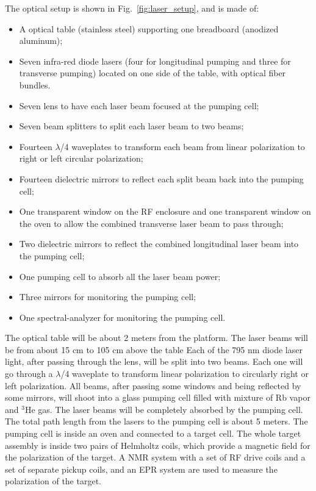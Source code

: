 {The optical setup is shown in Fig.~\ref{fig:laser_setup}, and is made of:
\begin {itemize}
\item A optical table (stainless steel) supporting one breadboard 
(anodized aluminum);
\item Seven infra-red diode lasers (four for longitudinal pumping and three 
for transverse pumping) located on one side of the table, with optical 
fiber bundles.
\item Seven lens to have each laser beam focused at the pumping cell;
\item Seven beam splitters to split each laser beam to two beams;
\item Fourteen $\lambda$/4 waveplates to transform each beam from
linear polarization to right or left circular polarization;
\item Fourteen dielectric mirrors to reflect each split beam back into the pumping cell;
\item One transparent window on the RF enclosure and one transparent window 
on the oven to allow the combined transverse laser beam to pass through;
\item Two dielectric mirrors to reflect the combined longitudinal 
laser beam into the pumping cell;
\item One pumping cell to absorb all the laser beam power;
\item Three mirrors for monitoring the pumping cell;
\item One spectral-analyzer for monitoring the pumping cell.
\end {itemize}

The optical table will be about 2 meters from the platform.
The laser beams will be from about 15 cm to 105 cm above the table
Each of the 795 nm diode laser light, after passing through the lens,
will be split into two beams. Each one will go through a $\lambda$/4 waveplate
to transform linear polarization to circularly right or left polarization. 
All beams, after passing some windows and being reflected by some mirrors,  
will shoot into a glass pumping cell filled with
mixture of Rb vapor and $^3$He gas. The laser beams will be completely absorbed
by the pumping cell. The total path length from the lasers to the pumping cell
is about 5 meters. The pumping cell is inside an oven and 
connected to a target cell. The whole target assembly is inside two pairs of
Helmholtz coils, which provide a magnetic field for the polarization of the
target. A NMR system with a set of RF drive coils and a set of separate 
pickup coils, and an EPR system 
are used to measure the polarization of the target.


}
